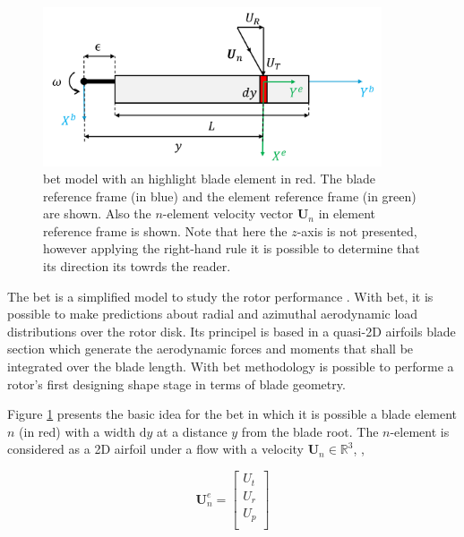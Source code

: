 \begin{figure}[!htb]
    \centering
    \includegraphics[width=10cm]{Figures/background/bet/blade.png}
    \caption{\gls{bet} model with an highlight blade element in red. The blade reference frame (in blue) and the element reference frame (in green) are shown. Also the $n$-element velocity vector $\mathbf{U}_n$ in element reference frame is shown. Note that here the $z$-axis is not presented, however applying the right-hand rule it is possible to determine that its direction its towrds the reader.}
    \label{fig:blade_bet}
\end{figure}

The \gls{bet} is a simplified model to study the rotor performance \cite{leishman_principles_2006}. With \gls{bet}, it is possible to make predictions about radial and azimuthal aerodynamic load distributions over the rotor disk. Its principel is based in a quasi-2D airfoils blade section which generate the aerodynamic forces and moments that shall be integrated over the blade length. With \gls{bet} methodology is possible to performe a rotor's first designing shape stage in terms of blade geometry.

Figure \ref{fig:blade_bet} presents the basic idea for the \gls{bet} in which it is possible a blade element $n$ (in red) with a width $\mathrm{d}y$ at a distance $y$ from the blade root. The $n$-element is considered as a 2D airfoil under a flow with a velocity $\mathbf{U}_n \in \mathbb{R}^3$, ,

\begin{equation}
    \mathbf{U}_n^e = 
    \begin{bmatrix}
        U_t \\
        U_r \\
        U_p \\
    \end{bmatrix}
    \label{eq:velocity_vector_in_element}
\end{equation}


